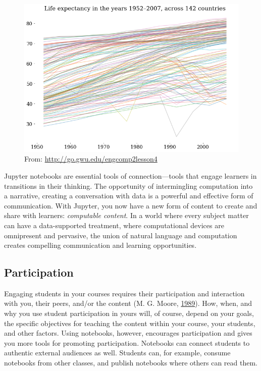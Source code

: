 \documentclass[]{book}
\begin{document}
\begin{figure}
\centering
\includegraphics{images/engcomp2lesson4-life-expectancy.png}
\caption{From: \url{http://go.gwu.edu/engcomp2lesson4}}
\end{figure}

Jupyter notebooks are essential tools of connection---tools that engage
learners in transitions in their thinking. The opportunity of
intermingling computation into a narrative, creating a conversation with
data is a powerful and effective form of communication. With Jupyter,
you now have a new form of content to create and share with learners:
\emph{computable content}. In a world where every subject matter can
have a data-supported treatment, where computational devices are
omnipresent and pervasive, the union of natural language and computation
creates compelling communication and learning opportunities.

\subsection{Participation}\label{participation}

Engaging students in your courses requires their participation and
interaction with you, their peers, and/or the content (M. G. Moore,
\protect\hyperlink{ref-moore1989three}{1989}). How, when, and why you
use student participation in yours will, of course, depend on your
goals, the specific objectives for teaching the content within your
course, your students, and other factors. Using notebooks, however,
encourages participation and gives you more tools for promoting
participation. Notebooks can connect students to authentic external
audiences as well. Students can, for example, consume notebooks from
other classes, and publish notebooks where others can read them.
\end{document}
